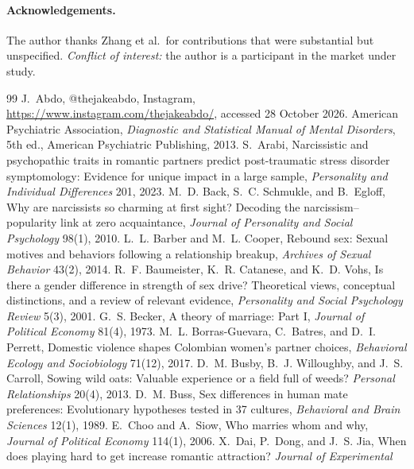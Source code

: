 \documentclass[11pt]{article}
\theoremstyle{definition}
\theoremstyle{remark}
\begin{document}
\paragraph*{Acknowledgements.} The author thanks Zhang et al.\ for
contributions that were substantial but unspecified. \emph{Conflict
of interest:} the author is a participant in the market under study.

\newpage %
\begin{thebibliography}{99}
   J.~Abdo, @thejakeabdo, Instagram,
  \url{https://www.instagram.com/thejakeabdo/}, accessed 28 October
  2026.
   American Psychiatric Association, \emph{Diagnostic and
  Statistical Manual of Mental Disorders}, 5th ed., American Psychiatric
  Publishing, 2013.
   S.~Arabi, Narcissistic and psychopathic traits in
  romantic partners predict post-traumatic stress disorder symptomology:
  Evidence for unique impact in a large sample, \emph{Personality and
  Individual Differences} 201, 2023.
   M.~D. Back, S.~C. Schmukle, and B.~Egloff, Why are
  narcissists so charming at first sight? Decoding the
  narcissism--popularity link at zero acquaintance, \emph{Journal of
  Personality and Social Psychology} 98(1), 2010.
   L.~L. Barber and M.~L. Cooper, Rebound sex: Sexual
  motives and behaviors following a relationship breakup, \emph{Archives
  of Sexual Behavior} 43(2), 2014.
   R.~F. Baumeister, K.~R. Catanese, and K.~D. Vohs,
  Is there a gender difference in strength of sex drive? Theoretical
  views, conceptual distinctions, and a review of relevant evidence,
  \emph{Personality and Social Psychology Review} 5(3), 2001.
   G.~S. Becker, A theory of marriage: Part I,
  \emph{Journal of Political Economy} 81(4), 1973.
   M.~L. Borras-Guevara, C.~Batres, and D.~I. Perrett,
  Domestic violence shapes Colombian women's partner choices,
  \emph{Behavioral Ecology and Sociobiology} 71(12), 2017.
   D.~M. Busby, B.~J. Willoughby, and J.~S. Carroll,
  Sowing wild oats: Valuable experience or a field full of weeds?
  \emph{Personal Relationships} 20(4), 2013.
   D.~M. Buss, Sex differences in human mate preferences:
  Evolutionary hypotheses tested in 37 cultures, \emph{Behavioral and
  Brain Sciences} 12(1), 1989.
   E.~Choo and A.~Siow, Who marries whom and why,
  \emph{Journal of Political Economy} 114(1), 2006.
   X.~Dai, P.~Dong, and J.~S. Jia, When does playing hard to
  get increase romantic attraction? \emph{Journal of Experimental
}
\end{thebibliography}
\end{document}
